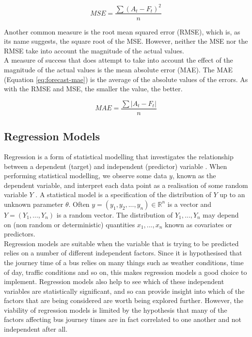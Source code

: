 \begin{equation}
\label{eq:forecast-mse}
    MSE = \frac{\sum(A_t-F_t)^2}{n}
\end{equation}

Another common measure is the root mean squared error (RMSE), which is, as its name suggests, the square root of the MSE. However, neither the MSE nor the RMSE take into account the magnitude of the actual values. \\

A measure of success that does attempt to take into account the effect of the magnitude of the actual values is the mean absolute error (MAE). The MAE (Equation \ref{eq:forecast-mae}) is the average of the absolute values of the errors. As with the RMSE and MSE, the smaller the value, the better.  

\begin{equation}
\label{eq:forecast-mae}
    MAE = \frac{\sum|A_t-F_t|}{n}
\end{equation}


\subsection{Regression Models}
\label{section:regression-models-research}

Regression is a form of statistical modelling that investigates the relationship between a dependent (target) and independent (predictor) variable \cite{regression-techniques}. When performing statistical modelling, we observe some data $y$, known as the dependent variable, and interpret each data point as a realisation of some random variable $Y$ \cite{m2s2-notes}. A statistical model is a specification of the distribution of $Y$ up to an unknown parameter $\theta$. Often $y = (y_1, y_2, ..., y_n) \in \mathbb{R} ^ n$ is a vector and $Y = (Y_1, ..., Y_n)$ is a random vector. The distribution of $Y_1, ..., Y_n$ may depend on (non random or deterministic) quantities $x_1, ..., x_n$ known as covariates or predictors. \\

Regression models are suitable when the variable that is trying to be predicted relies on a number of different independent factors. Since it is hypothesised that the journey time of a bus relies on many things such as weather conditions, time of day, traffic conditions and so on, this makes regression models a good choice to implement. Regression models also help to see which of these independent variables are statistically significant, and so can provide insight into which of the factors that are being considered are worth being explored further. However, the viability of regression models is limited by the hypothesis that many of the factors affecting bus journey times are in fact correlated to one another and not independent after all. 

